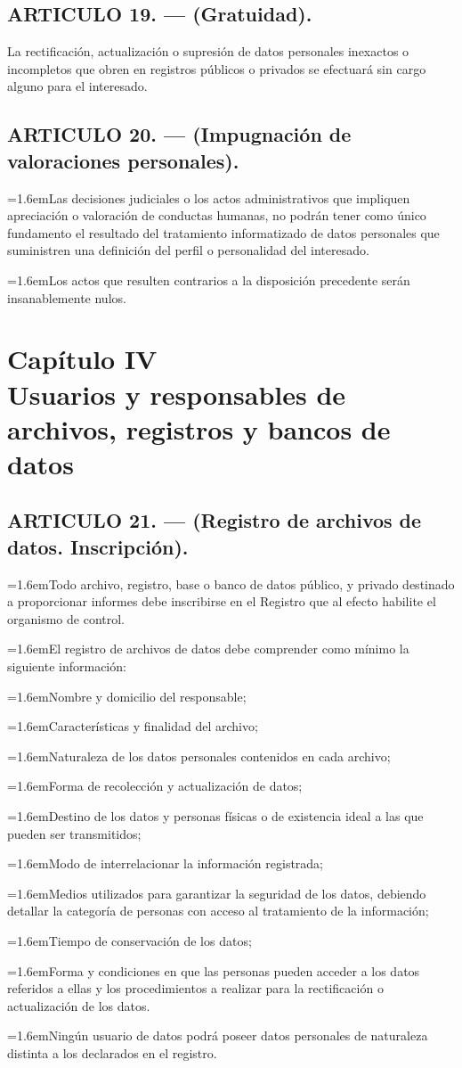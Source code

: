 \documentclass[10pt,a4paper]{article}
\newcommand{\capitulo}[2]{\section[#1 --- #2]{#1\\[2pt]#2}}
\newcommand{\articulo}[1]{\subsection{#1}}
\newcommand{\inciso}[2]{\par{\hangindent=1.6em\hangafter=1\makebox[1.6em][l]{#1}#2\par}}
\begin{document}
\articulo{ARTICULO 19. — (Gratuidad).}
La rectificación, actualización o supresión de datos personales inexactos o incompletos que obren en registros públicos o privados se efectuará sin cargo alguno para el interesado.

\articulo{ARTICULO 20. — (Impugnación de valoraciones personales).}
\inciso{1.}{Las decisiones judiciales o los actos administrativos que impliquen apreciación o valoración de conductas humanas, no podrán tener como único fundamento el resultado del tratamiento informatizado de datos personales que suministren una definición del perfil o personalidad del interesado.}

\inciso{2.}{Los actos que resulten contrarios a la disposición precedente serán insanablemente nulos.}

\capitulo{Capítulo IV}{Usuarios y responsables de archivos, registros y bancos de datos}
\articulo{ARTICULO 21. — (Registro de archivos de datos. Inscripción).}
\inciso{1.}{Todo archivo, registro, base o banco de datos público, y privado destinado a proporcionar informes debe inscribirse en el Registro que al efecto habilite el organismo de control.}

\inciso{2.}{El registro de archivos de datos debe comprender como mínimo la siguiente información:}

\inciso{a)}{Nombre y domicilio del responsable;}

\inciso{b)}{Características y finalidad del archivo;}

\inciso{c)}{Naturaleza de los datos personales contenidos en cada archivo;}

\inciso{d)}{Forma de recolección y actualización de datos;}

\inciso{e)}{Destino de los datos y personas físicas o de existencia ideal a las que pueden ser transmitidos;}

\inciso{f)}{Modo de interrelacionar la información registrada;}

\inciso{g)}{Medios utilizados para garantizar la seguridad de los datos, debiendo detallar la categoría de personas con acceso al tratamiento de la información;}

\inciso{h)}{Tiempo de conservación de los datos;}

\inciso{i)}{Forma y condiciones en que las personas pueden acceder a los datos referidos a ellas y los procedimientos a realizar para la rectificación o actualización de los datos.}

\inciso{3)}{Ningún usuario de datos podrá poseer datos personales de naturaleza distinta a los declarados en el registro.}
\end{document}
